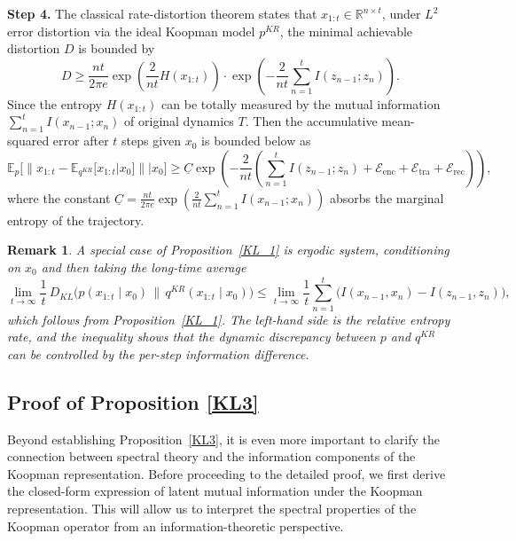 \documentclass{article} %
\newtheorem{remark}[theorem]{Remark}
\begin{document}
\begin{proofwithframe}
\textbf{Step 4.} The classical rate-distortion theorem \citep{cover1999elements} states that $x_{1:t} \in \mathbb{R}^{n\times t}$, under $L^2$ error distortion via the ideal Koopman model $p^{KR}$, the minimal achievable distortion $D$ is bounded by 
\begin{equation}
    D \geq \frac{nt}{2\pi e} \exp (\frac{2}{nt} H(x_{1:t})) \cdot \exp(-\frac{2}{nt} \sum_{n=1}^t I(z_{n-1};z_n)).
\end{equation}
Since the entropy $H(x_{1:t})$ can be totally measured by the mutual information $\sum_{n=1}^t I(x_{n-1}; x_{n})$ of original dynamics $T$. Then the accumulative mean-squared error after $t$ steps given $x_0$ is bounded below as 
\begin{equation} \label{eq:lower_bound}
    \mathbb{E}_p\big[ \| x_{1:t}  - \mathbb{E}_{q^{KR}} [ x_{1:t} |x_0 ] \| | x_0 \big] \geq \underline{C} \exp(- \frac{2}{nt} (\sum_{n=1}^t I(z_{n-1};z_n)  + \mathcal{E}_{\text{enc}} + \mathcal{E}_{\text{tra}} + \mathcal{E}_{\text{rec}})),
\end{equation}
where the constant $\underline{C} = \frac{nt}{2\pi e} \exp (\frac{2}{nt} \sum_{n=1}^t I(x_{n-1}; x_{n})) $ absorbs the marginal entropy of the trajectory. 
\end{proofwithframe}

\begin{remark}
A special case of Proposition~\ref{KL_1} is  ergodic system, conditioning on $x_0$ and then taking the long-time average
\[
\lim_{t\to\infty}\frac{1}{t}\,
D_{KL}\big(p(x_{1:t}\mid x_0)\,\|\,q^{KR}(x_{1:t}\mid x_0)\big)
\leq 
\lim_{t\to\infty}\frac{1}{t} \sum_{n = 1}^t \big(I(x_{n-1}, x_n) - I(z_{n-1}, z_{n})\big),
\]
which follows from Proposition~\ref{KL_1}. The left-hand side is the \emph{relative entropy rate}, and the inequality shows
that the dynamic discrepancy between $p$ and $q^{KR}$ can be controlled by the
per-step information difference.
\end{remark}


\subsection{Proof of Proposition \ref{KL3}}
\label{claim:infor_disentangle}

Beyond establishing Proposition~\ref{KL3}, it is even more important to clarify the connection between spectral theory and the information components of the Koopman representation. Before proceeding to the detailed proof, we first derive the closed-form expression of latent mutual information under the Koopman representation. This will allow us to interpret the spectral properties of the Koopman operator from an information-theoretic perspective.
\end{document}
